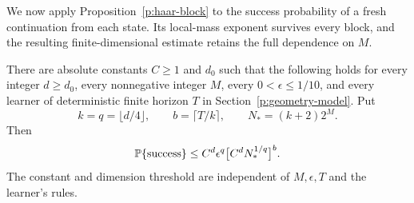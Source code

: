 We now apply Proposition~\ref{p:haar-block} to the success probability of
a fresh continuation from each state. Its local-mass exponent survives
every block, and the resulting finite-dimensional estimate retains the
full dependence on \(M\).

\begin{proposition}
\label{p:haar-success-proposition}
There are absolute constants \(C\ge1\) and \(d_0\) such that the
following holds for every integer \(d\ge d_0\), every nonnegative integer
\(M\), every \(0<\epsilon\le1/10\), and every learner of deterministic
finite horizon \(T\) in Section~\ref{p:geometry-model}. Put
\[
 k=q=\lfloor d/4\rfloor,\qquad
 b=\lceil T/k\rceil,\qquad N_*=(k+2)2^M.
\]
Then
\begin{equation}\label{p:haar-success}
 \mathbb P\{\text{success}\}\le
 C^d\epsilon^q\bigl[C^dN_*^{1/q}\bigr]^b.
\end{equation}
The constant and dimension threshold are independent of \(M,\epsilon,T\)
and the learner's rules.
\end{proposition}

